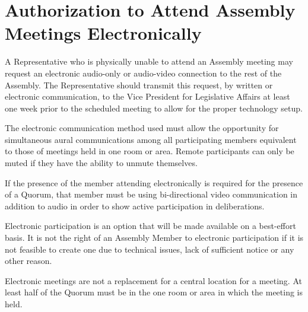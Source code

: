 \section{Authorization to Attend Assembly Meetings Electronically}
\begin{bylaws-number}
  \item A Representative who is physically unable to attend an Assembly meeting may request an electronic audio-only or audio-video connection to the rest of the Assembly. The Representative should transmit this request, by written or electronic communication, to the Vice President for Legislative Affairs at least one week prior to the scheduled meeting to allow for the proper technology setup.
  \item The electronic communication method used must allow the opportunity for simultaneous aural communications among all participating members equivalent to those of meetings held in one room or area. Remote participants can only be muted if they have the ability to unmute themselves.
  \begin{bylaws-number}
    \item If the presence of the member attending electronically is required for the presence of a Quorum, that member must be using bi-directional video communication in addition to audio in order to show active participation in deliberations.
  \end{bylaws-number}
  \item Electronic participation is an option that will be made available on a best-effort basis. It is not the right of an Assembly Member to electronic participation if it is not feasible to create one due to technical issues, lack of sufficient notice or any other reason.
  \item Electronic meetings are not a replacement for a central location for a meeting. At least half of the Quorum must be in the one room or area in which the meeting is held.
\end{bylaws-number}
